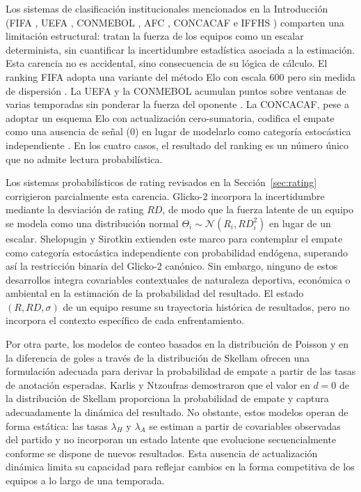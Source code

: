 Los sistemas de clasificaci\'on institucionales mencionados en la  Introducci\'on (FIFA \cite{FIFARanking2024}, UEFA \cite{UEFARanking2024}, CONMEBOL \cite{CONMEBOLRanking2021}, AFC  \cite{AFCRanking2024}, CONCACAF \cite{CONCACAFRanking2023} e IFFHS  \cite{IFFHSRanking2021}) comparten una limitaci\'on estructural: tratan la fuerza de los equipos como un escalar determinista, sin  cuantificar la incertidumbre estad\'istica asociada a la estimaci\'on. Esta carencia no es accidental, sino consecuencia de su l\'ogica de c\'alculo. El ranking FIFA adopta una variante del m\'etodo Elo con escala $600$ pero sin medida de dispersi\'on \cite{FIFARanking2024}. La UEFA y la CONMEBOL acumulan puntos sobre ventanas de varias temporadas sin ponderar la fuerza del oponente \cite{UEFARanking2024,CONMEBOLRanking2021}. La CONCACAF, pese a adoptar un esquema Elo con actualizaci\'on cero-sumatoria, codifica el empate como una ausencia de se\~nal ($0$) en lugar de modelarlo como categor\'ia estoc\'astica independiente \cite{CONCACAFRanking2023}. En los cuatro casos, el resultado del ranking es un n\'umero \'unico que no admite lectura probabil\'istica.

Los sistemas probabil\'isticos de rating revisados en la Secci\'on~\ref{sec:rating} corrigieron parcialmente esta carencia. Glicko-2 \cite{Glickman2022} incorpora la incertidumbre mediante la desviaci\'on de rating $RD$, de modo que la fuerza latente de un equipo se modela como una distribuci\'on normal $\Theta_i \sim \mathcal{N}(R_i, RD_i^2)$ en lugar de un escalar. Shelopugin y Sirotkin \cite{Glicko2Mod} extienden este marco para contemplar el empate como categor\'ia estoc\'astica independiente con probabilidad end\'ogena, superando as\'i la restricci\'on binaria del Glicko-2 can\'onico. Sin embargo, ninguno de estos desarrollos integra covariables contextuales de naturaleza deportiva, econ\'omica o ambiental en la estimaci\'on de la probabilidad del resultado. El estado $(R, RD, \sigma)$ de un equipo resume su trayectoria hist\'orica de resultados, pero no incorpora el contexto espec\'ifico de cada enfrentamiento.

Por otra parte, los modelos de conteo basados en la distribuci\'on de Poisson \cite{maher1982} y en la diferencia de goles a trav\'es de la distribuci\'on de Skellam \cite{skellam1946,karlis2003} ofrecen una formulaci\'on adecuada para derivar la probabilidad de empate a partir de las tasas de anotaci\'on esperadas. Karlis y Ntzoufras \cite{karlis2003} demostraron que el valor en $d=0$ de la distribuci\'on de Skellam proporciona la probabilidad de empate y captura adecuadamente la din\'amica del resultado. No obstante, estos modelos operan de forma est\'atica: las tasas $\lambda_H$ y $\lambda_A$ se estiman a partir de covariables observadas del partido y no incorporan un estado latente que evolucione secuencialmente conforme se dispone de nuevos resultados. Esta ausencia de actualizaci\'on din\'amica limita su capacidad para reflejar cambios en la forma competitiva de los equipos a lo largo de una temporada.

